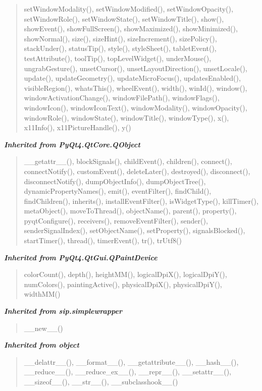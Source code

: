 \begin{quote}
setWindowModality(), setWindowModified(), setWindowOpacity(), setWindowRole(), setWindowState(), setWindowTitle(), show(), showEvent(), showFullScreen(), showMaximized(), showMinimized(), showNormal(), size(), sizeHint(), sizeIncrement(), sizePolicy(), stackUnder(), statusTip(), style(), styleSheet(), tabletEvent(), testAttribute(), toolTip(), topLevelWidget(), underMouse(), ungrabGesture(), unsetCursor(), unsetLayoutDirection(), unsetLocale(), update(), updateGeometry(), updateMicroFocus(), updatesEnabled(), visibleRegion(), whatsThis(), wheelEvent(), width(), winId(), window(), windowActivationChange(), windowFilePath(), windowFlags(), windowIcon(), windowIconText(), windowModality(), windowOpacity(), windowRole(), windowState(), windowTitle(), windowType(), x(), x11Info(), x11PictureHandle(), y()
\end{quote}

\large{\textbf{\textit{Inherited from PyQt4.QtCore.QObject}}}

\begin{quote}
\_\_getattr\_\_(), blockSignals(), childEvent(), children(), connect(), connectNotify(), customEvent(), deleteLater(), destroyed(), disconnect(), disconnectNotify(), dumpObjectInfo(), dumpObjectTree(), dynamicPropertyNames(), emit(), eventFilter(), findChild(), findChildren(), inherits(), installEventFilter(), isWidgetType(), killTimer(), metaObject(), moveToThread(), objectName(), parent(), property(), pyqtConfigure(), receivers(), removeEventFilter(), sender(), senderSignalIndex(), setObjectName(), setProperty(), signalsBlocked(), startTimer(), thread(), timerEvent(), tr(), trUtf8()
\end{quote}

\large{\textbf{\textit{Inherited from PyQt4.QtGui.QPaintDevice}}}

\begin{quote}
colorCount(), depth(), heightMM(), logicalDpiX(), logicalDpiY(), numColors(), paintingActive(), physicalDpiX(), physicalDpiY(), widthMM()
\end{quote}

\large{\textbf{\textit{Inherited from sip.simplewrapper}}}

\begin{quote}
\_\_new\_\_()
\end{quote}

\large{\textbf{\textit{Inherited from object}}}

\begin{quote}
\_\_delattr\_\_(), \_\_format\_\_(), \_\_getattribute\_\_(), \_\_hash\_\_(), \_\_reduce\_\_(), \_\_reduce\_ex\_\_(), \_\_repr\_\_(), \_\_setattr\_\_(), \_\_sizeof\_\_(), \_\_str\_\_(), \_\_subclasshook\_\_()
\end{quote}

